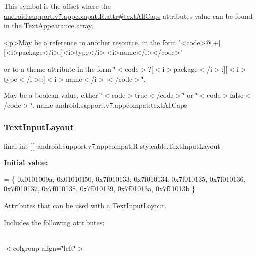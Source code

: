 This symbol is the offset where the \hyperlink{classandroid_1_1support_1_1v7_1_1appcompat_1_1R_1_1attr_a3bd1f2ce4b725772d80858408dc8d52c}{android.\+support.\+v7.\+appcompat.\+R.\+attr\#text\+All\+Caps} attribute\textquotesingle{}s value can be found in the \hyperlink{classandroid_1_1support_1_1v7_1_1appcompat_1_1R_1_1styleable_a85d64ca373dd3c60f50e0e9c1a55a8da}{Text\+Appearance} array.

\begin{DoxyVerb}      <p>May be a reference to another resource, in the form "<code>@[+][<i>package</i>:]<i>type</i>:<i>name</i></code>"
\end{DoxyVerb}
 or to a theme attribute in the form \char`\"{}$<$code$>$?\mbox{[}$<$i$>$package$<$/i$>$\+:\mbox{]}\mbox{[}$<$i$>$type$<$/i$>$\+:\mbox{]}$<$i$>$name$<$/i$>$$<$/code$>$\char`\"{}. 

May be a boolean value, either \char`\"{}$<$code$>$true$<$/code$>$\char`\"{} or \char`\"{}$<$code$>$false$<$/code$>$\char`\"{}.  name android.\+support.\+v7.\+appcompat\+:text\+All\+Caps \mbox{\label{classandroid_1_1support_1_1v7_1_1appcompat_1_1R_1_1styleable_a618db13ebe8aab96f9d951a0d1c7d5bc}} 
\subsubsection{\texorpdfstring{Text\+Input\+Layout}{TextInputLayout}}
{\footnotesize\ttfamily final int \mbox{[}$\,$\mbox{]} android.\+support.\+v7.\+appcompat.\+R.\+styleable.\+Text\+Input\+Layout\hspace{0.3cm}{\ttfamily [static]}}

{\bfseries Initial value\+:}
\begin{DoxyCode}
= \{
            0x0101009a, 0x01010150, 0x7f010133, 0x7f010134,
            0x7f010135, 0x7f010136, 0x7f010137, 0x7f010138,
            0x7f010139, 0x7f01013a, 0x7f01013b
        \}
\end{DoxyCode}
Attributes that can be used with a Text\+Input\+Layout. 

Includes the following attributes\+:

\tabulinesep=1mm
\begin{longtabu} spread 0pt [c]{*{0}{|X[-1]}|}
\hline
\end{longtabu}
$<$colgroup align=\char`\"{}left\char`\"{}$>$ 

